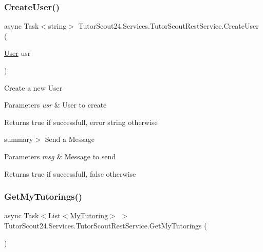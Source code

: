 \subsubsection{\texorpdfstring{Create\+User()}{CreateUser()}}
{\footnotesize\ttfamily async Task$<$string$>$ Tutor\+Scout24.\+Services.\+Tutor\+Scout\+Rest\+Service.\+Create\+User (\begin{DoxyParamCaption}\item[{\mbox{\hyperlink{class_tutor_scout24_1_1_models_1_1_user_data_1_1_user}{User}}}]{usr }\end{DoxyParamCaption})\hspace{0.3cm}{\ttfamily [inline]}}



Create a new User 


\begin{DoxyParams}{Parameters}
{\em usr} & User to create\\
\hline
\end{DoxyParams}
\begin{DoxyReturn}{Returns}
true if successfull, error string otherwise
\end{DoxyReturn}
summary$>$ Send a Message 


\begin{DoxyParams}{Parameters}
{\em msg} & Message to send\\
\hline
\end{DoxyParams}
\begin{DoxyReturn}{Returns}
true if successfull, false otherwise
\end{DoxyReturn}
\mbox{\label{class_tutor_scout24_1_1_services_1_1_tutor_scout_rest_service_a5171b947d8edb9279062e9af1f32e41f}} 
\subsubsection{\texorpdfstring{Get\+My\+Tutorings()}{GetMyTutorings()}}
{\footnotesize\ttfamily async Task$<$List$<$\mbox{\hyperlink{class_tutor_scout24_1_1_models_1_1_tutorings_1_1_my_tutoring}{My\+Tutoring}}$>$ $>$ Tutor\+Scout24.\+Services.\+Tutor\+Scout\+Rest\+Service.\+Get\+My\+Tutorings (\begin{DoxyParamCaption}{ }\end{DoxyParamCaption})\hspace{0.3cm}{\ttfamily [inline]}}



